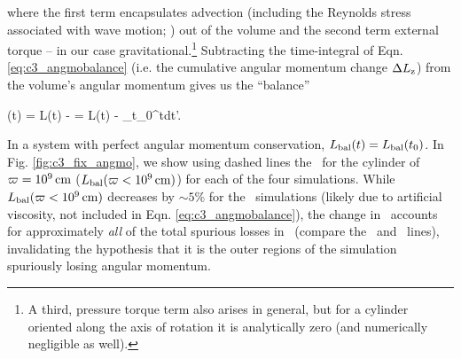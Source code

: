 

\noindent where the first term encapsulates advection (including the Reynolds stress associated with wave motion; \citealt{papal95, balb03, kratl16}) out of the volume and the second term external torque -- in our case gravitational.\footnote{A third, pressure torque term also arises in general, but for a cylinder oriented along the axis of rotation it is analytically zero (and numerically negligible as well).}  Subtracting the time-integral of Eqn. \ref{eq:c3_angmobalance} (i.e. the cumulative angular momentum change $\Delta \Lz$) from the volume's angular momentum gives us the ``balance''

\eqbegin
\Lbal(t) = L(t) - \Delta \Lz = L(t) - \int_{t_0}^{t}dt'.
\label{eq:c3_angmobalance2}
\eqend

\noindent In a system with perfect angular momentum conservation, $\Lbal(t) = \Lbal(t_0)$.  In Fig. \ref{fig:c3_fix_angmo}, we show using dashed lines the \Lbal\ for the cylinder of $\varpi = 10^9\,\mathrm{cm}$ ($\Lbal(\winnercyl)$) for each of the four simulations.  While $\Lbal(\winnercyl)$ decreases by $\sim5$\% for the \gasoline\ simulations (likely due to artificial viscosity, not included in Eqn. \ref{eq:c3_angmobalance}), the change in \Lbal\ accounts for approximately \textit{all} of the total spurious losses in \arepo\ (compare the \Lztot\ and \Lbal\ lines), invalidating the hypothesis that it is the outer regions of the simulation spuriously losing angular momentum.  


